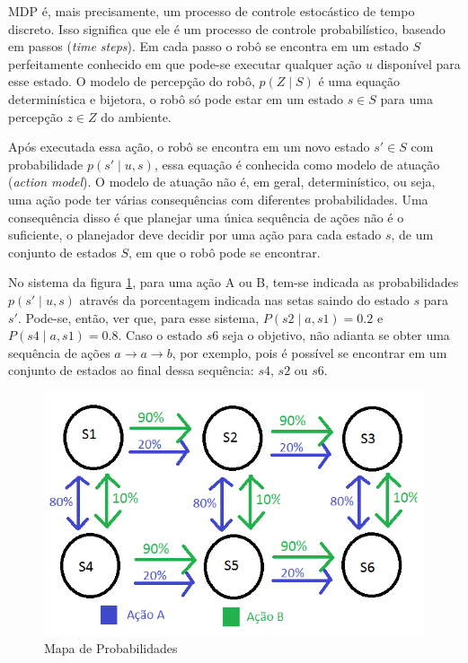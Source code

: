 MDP é, mais precisamente, um processo de controle estocástico de tempo discreto. Isso significa que ele é um processo de controle probabilístico, baseado em passos (\textit{time steps}). Em cada passo o robô se encontra em um estado $ S $ perfeitamente conhecido em que pode-se executar qualquer ação $ u $ disponível para esse estado. O modelo de percepção do robô, $ p \left( Z \mid S \right) $ é uma equação determinística e bijetora, o robô só pode estar em um estado $ s \in S $ para uma percepção $ z \in Z $ do ambiente.

Após executada essa ação, o robô se encontra em um novo estado $ s' \in S $ com probabilidade $ p \left( s' \mid u, s \right) $, essa equação é conhecida como modelo de atuação (\textit{action model}). O modelo de atuação não é, em geral, determinístico, ou seja, uma ação pode ter várias consequências com diferentes probabilidades. Uma consequência disso é que planejar uma única sequência de ações não é o suficiente, o planejador deve decidir por uma ação para cada estado $ s $, de um conjunto de estados $ S $, em que o robô pode se encontrar.

No sistema da figura \ref{img:MapaDeProbabilidadesMarkov}, para uma ação A ou B, tem-se indicada as probabilidades $ p \left( s' \mid u, s \right) $ através da porcentagem indicada nas setas saindo do estado $ s $ para $ s' $. Pode-se, então, ver que, para esse sistema, $ P \left( s2 \mid a, s1 \right) = 0.2 $ e $ P \left( s4 \mid a, s1 \right) = 0.8 $. Caso o estado $ s6 $ seja o objetivo, não adianta se obter uma sequência de ações $ a \rightarrow a \rightarrow b$, por exemplo, pois é possível se encontrar em um conjunto de estados ao final dessa sequência: $ s4 $, $ s2 $ ou $ s6 $.

\begin{figure}[h]
    \centering
    \includegraphics[width=120mm]{images/probabilidade-markov}
    \caption{Mapa de Probabilidades}
    \label{img:MapaDeProbabilidadesMarkov}
\end{figure}

